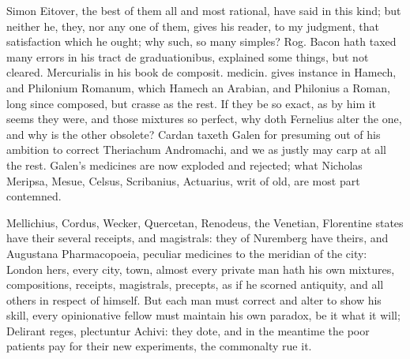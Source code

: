 {Simon Eitover, the best of them all and most rational, have said in
this kind; but neither he, they, nor any one of them, gives his reader,
to my judgment, that satisfaction which he ought; why such, so many
simples? Rog. Bacon hath taxed many errors in his tract de
graduationibus, explained some things, but not cleared. Mercurialis in
his book de composit. medicin. gives instance in Hamech, and Philonium
Romanum, which Hamech an Arabian, and Philonius a Roman, long since
composed, but crasse as the rest. If they be so exact, as by him it
seems they were, and those mixtures so perfect, why doth Fernelius
alter the one, and why is the other obsolete? Cardan taxeth Galen
for presuming out of his ambition to correct Theriachum Andromachi, and
we as justly may carp at all the rest. Galen's medicines are now
exploded and rejected; what Nicholas Meripsa, Mesue, Celsus,
Scribanius, Actuarius, \etc{} writ of old, are most part contemned.

Mellichius, Cordus, Wecker, Quercetan, Renodeus, the Venetian,
Florentine states have their several receipts, and magistrals: they of
Nuremberg have theirs, and Augustana Pharmacopoeia, peculiar medicines
to the meridian of the city: London hers, every city, town, almost
every private man hath his own mixtures, compositions, receipts,
magistrals, precepts, as if he scorned antiquity, and all others in
respect of himself. But each man must correct and alter to show his
skill, every opinionative fellow must maintain his own paradox, be it
what it will; Delirant reges, plectuntur Achivi: they dote, and in the
meantime the poor patients pay for their new experiments, the
commonalty rue it.

}
